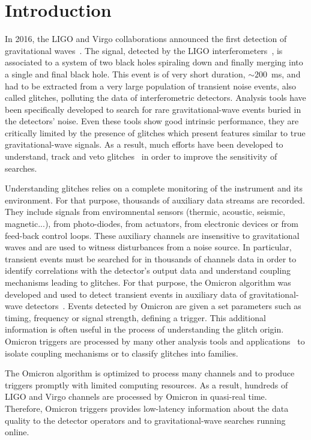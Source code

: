 \section{Introduction} \label{sec:introduction}
In 2016, the LIGO and Virgo collaborations announced the first detection of gravitational waves~\cite{Abbott:2016blz}. The signal, detected by the LIGO interferometers~\cite{Abramovici:1992ah}, is associated to a system of two black holes spiraling down and finally merging into a single and final black hole. This event is of very short duration, $\sim200$~ms, and had to be extracted from a very large population of transient noise events, also called glitches, polluting the data of interferometric detectors. Analysis tools have been specifically developed to search for rare gravitational-wave events buried in the detectors' noise. Even these tools show good intrinsic performance, they are critically limited by the presence of glitches which present features similar to true gravitational-wave signals. As a result, much efforts have been developed to understand, track and veto glitches~\cite{Aasi:2012wd,Aasi:2014mqd,TheLIGOScientific:2016zmo} in order to improve the sensitivity of searches.

Understanding glitches relies on a complete monitoring of the instrument and its environment. For that purpose, thousands of auxiliary data streams are recorded. They include signals from enviromnental sensors (thermic, acoustic, seismic, magnetic...), from photo-diodes, from actuators, from electronic devices or from feed-back control loops. These auxiliary channels are insensitive to gravitational waves and are used to witness disturbances from a noise source. In particular, transient events must be searched for in thousands of channels data in order to identify correlations with the detector's output data and understand coupling mechanisms leading to glitches. For that purpose, the Omicron algorithm was developed and used to detect transient events in auxiliary data of gravitational-wave detectors~\cite{Nuttall:2015dqa,TheLIGOScientific:2016zmo}. Events detected by Omicron are given a set parameters such as timing, frequency or signal strength, defining a trigger. This additional information is often useful in the process of understanding the glitch origin. Omicron triggers are processed by many other analysis tools and applications~\cite{Isogai:2010zz,Smith:2011an,gspy} to isolate coupling mechanisms or to classify glitches into families.

The Omicron algorithm is optimized to process many channels and to produce triggers promptly with limited computing resources. As a result, hundreds of LIGO and Virgo channels are processed by Omicron in quasi-real time. Therefore, Omicron triggers provides low-latency information about the data quality to the detector operators and to gravitational-wave searches running online.



